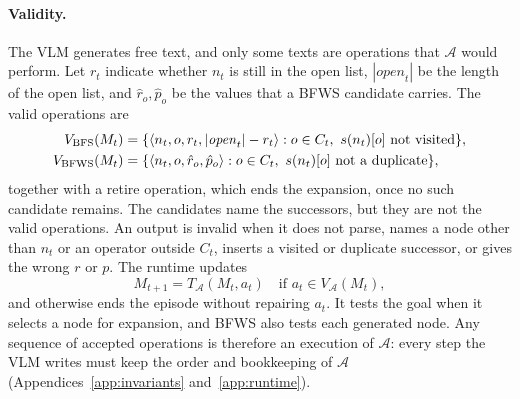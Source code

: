\paragraph{Validity.} The VLM generates free text, and only some texts are operations that $\mathcal{A}$ would perform. Let $r_t$ indicate whether $n_t$ is still in the open list, $|\mathit{open}_t|$ be the length of the open list, and $\hat r_o, \hat p_o$ be the values that a BFWS candidate carries. The valid operations are
\begin{equation}
\begin{aligned}
V_{\rm BFS}(M_t) &= \{\langle n_t, o, r_t, |\mathit{open}_t|-r_t\rangle : o\in C_t,\ s(n_t)[o] \text{ not visited}\},\\
V_{\rm BFWS}(M_t) &= \{\langle n_t, o, \hat r_o, \hat p_o\rangle : o\in C_t,\ s(n_t)[o] \text{ not a duplicate}\},
\end{aligned}
\label{eq:valid}
\end{equation}
together with a retire operation, which ends the expansion, once no such candidate remains. The candidates name the successors, but they are not the valid operations. An output is invalid when it does not parse, names a node other than $n_t$ or an operator outside $C_t$, inserts a visited or duplicate successor, or gives the wrong $r$ or $p$. The runtime updates
\begin{equation}
M_{t+1} = T_{\mathcal{A}}(M_t, a_t) \quad \text{if } a_t \in V_{\mathcal{A}}(M_t),
\label{eq:transition}
\end{equation}
and otherwise ends the episode without repairing $a_t$. It tests the goal when it selects a node for expansion, and BFWS also tests each generated node. Any sequence of accepted operations is therefore an execution of $\mathcal{A}$: every step the VLM writes must keep the order and bookkeeping of $\mathcal{A}$ (Appendices~\ref{app:invariants} and~\ref{app:runtime}).
